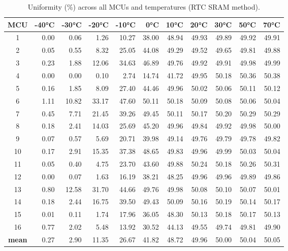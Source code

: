 \begin{table}[ht!]
    \centering
    \begin{tabular}{c||rrrrrrrrrr}
\toprule
\textbf{MCU} & \textbf{-40°C} & \textbf{-30°C} & \textbf{-20°C} & \textbf{-10°C} & \textbf{0°C} & \textbf{10°C} & \textbf{20°C} & \textbf{30°C} & \textbf{50°C} & \textbf{70°C} \\
\midrule
1    &   0.00 &   0.06 &   1.26 &  10.27 & 38.00 & 48.94 & 49.93 & 49.89 & 49.92 & 49.91 \\
2    &   0.05 &   0.55 &   8.32 &  25.05 & 44.08 & 49.29 & 49.52 & 49.65 & 49.81 & 49.88 \\
3    &   0.23 &   1.88 &  12.06 &  34.63 & 46.89 & 49.76 & 49.92 & 49.91 & 49.98 & 49.99 \\
4    &   0.00 &   0.00 &   0.10 &   2.74 & 14.74 & 41.72 & 49.95 & 50.18 & 50.36 & 50.38 \\
5    &   0.16 &   1.85 &   8.09 &  27.40 & 44.46 & 49.96 & 50.02 & 50.06 & 50.11 & 50.12 \\
6    &   1.11 &  10.82 &  33.17 &  47.60 & 50.11 & 50.18 & 50.09 & 50.08 & 50.06 & 50.04 \\
7    &   0.45 &   7.71 &  21.45 &  39.26 & 49.45 & 50.11 & 50.17 & 50.20 & 50.29 & 50.29 \\
8    &   0.18 &   2.41 &  14.03 &  25.69 & 45.20 & 49.96 & 49.84 & 49.92 & 49.98 & 50.00 \\
9    &   0.07 &   0.57 &   5.69 &  20.71 & 39.98 & 49.14 & 49.76 & 49.79 & 49.78 & 49.82 \\
10   &   0.17 &   2.91 &  15.35 &  37.38 & 48.65 & 49.83 & 49.96 & 49.99 & 50.03 & 50.04 \\
11   &   0.05 &   0.40 &   4.75 &  23.70 & 43.60 & 49.88 & 50.24 & 50.18 & 50.26 & 50.31 \\
12   &   0.00 &   0.07 &   1.63 &  16.19 & 38.21 & 48.25 & 49.96 & 49.96 & 49.89 & 49.86 \\
13   &   0.80 &  12.58 &  31.70 &  44.66 & 49.76 & 49.98 & 50.08 & 50.10 & 50.07 & 50.01 \\
14   &   0.18 &   2.44 &  16.75 &  39.50 & 49.43 & 50.09 & 50.16 & 50.19 & 50.14 & 50.17 \\
15   &   0.01 &   0.11 &   1.74 &  17.96 & 36.05 & 48.30 & 50.13 & 50.18 & 50.17 & 50.13 \\
16   &   0.77 &   2.02 &   5.48 &  13.92 & 30.52 & 44.13 & 49.55 & 49.74 & 49.81 & 49.90 \\
\textbf{mean} &   0.27 &   2.90 &  11.35 &  26.67 & 41.82 & 48.72 & 49.96 & 50.00 & 50.04 & 50.05 \\
\bottomrule
\end{tabular}
    \captionsetup{justification=centering,margin=0.5cm}
    \caption{Uniformity (\%) across all MCUs and temperatures (RTC SRAM method).}
    \label{table:uniformity_rtc_sram}
\end{table}

